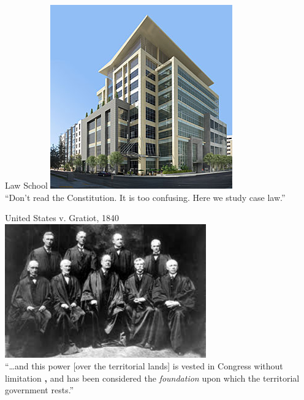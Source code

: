\begin{frame}{Law School}
    \centering
    \includegraphics[height=.7\textheight]{img/law-school.png} \\
    \pause
    \large{``Don't read the Constitution. It is too confusing. Here we study case law.''}
\end{frame}

\begin{frame}{United States v. Gratiot, 1840}
    \centering
    \includegraphics[width=0.65\textwidth]{img/sc-1905.png} \\
    ``\ldots and this power [over the territorial lands] is vested in Congress
    without limitation {\huge\color{red} \textbf{,}} and has been considered the \emph{foundation} upon which the
    territorial government rests.''
\end{frame}

